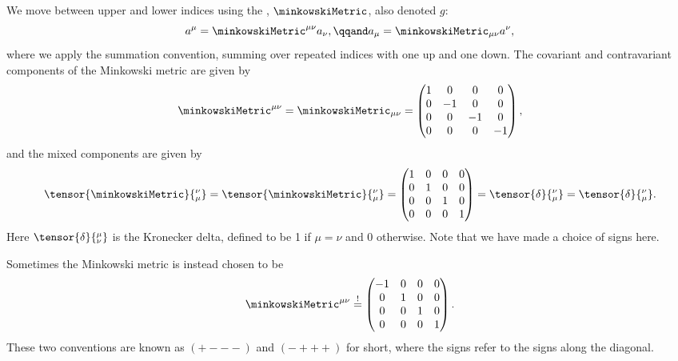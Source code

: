 We move between upper and lower indices using the , \(\minkowskiMetric\), also denoted \(g\):
\begin{equation}
    a^\mu = \minkowskiMetric^{\mu\nu}a_\nu, \qqand a_\mu = \minkowskiMetric_{\mu\nu}a^\nu,
\end{equation}
where we apply the summation convention, summing over repeated indices with one up and one down.
The covariant and contravariant components of the Minkowski metric are given by
\begin{equation}
    \minkowskiMetric^{\mu\nu} = \minkowskiMetric_{\mu\nu} = 
    \begin{pmatrix}
        1 & 0 & 0 & 0\\
        0 & -1 & 0 & 0\\
        0 & 0 & -1 & 0\\
        0 & 0 & 0 & -1
    \end{pmatrix}
    ,
\end{equation}
and the mixed components are given by
\begin{equation}
    \tensor{\minkowskiMetric}{_\mu^\nu} = \tensor{\minkowskiMetric}{^\nu_\mu} = 
    \begin{pmatrix}
        1 & 0 & 0 & 0\\
        0 & 1 & 0 & 0\\
        0 & 0 & 1 & 0\\
        0 & 0 & 0 & 1
    \end{pmatrix}
    = \tensor{\delta}{_\mu^\nu} = \tensor{\delta}{^\nu_\mu}.
\end{equation}
Here \(\tensor{\delta}{^\mu_\nu}\) is the Kronecker delta, defined to be 1 if \(\mu = \nu\) and 0 otherwise.
Note that we have made a choice of signs here.
\begin{wrn}
    Sometimes the Minkowski metric is instead chosen to be
    \begin{equation}
        \minkowskiMetric^{\mu\nu} \stackrel{!}{=} 
        \begin{pmatrix}
            -1 & 0 & 0 & 0\\
            0 & 1 & 0 & 0\\
            0 & 0 & 1 & 0\\
            0 & 0 & 0 & 1
        \end{pmatrix}
        .
    \end{equation}
    These two conventions are known as \(({+}{-}{-}{-})\) and \(({-}{+}{+}{+})\) for short, where the signs refer to the signs along the diagonal.
\end{wrn}

